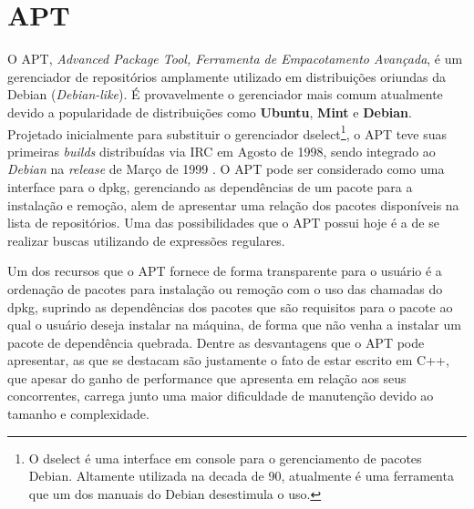\section{APT} %
\label{sec:apt}


O {\code APT}, \textit{Advanced Package Tool, Ferramenta de Empacotamento Avançada}, é um gerenciador de repositórios  amplamente utilizado em distribuições oriundas da Debian (\textit{Debian-like}).
É provavelmente o gerenciador mais comum atualmente devido a popularidade de distribuições como \textbf{Ubuntu}, \textbf{Mint} e \textbf{Debian}.
Projetado inicialmente para substituir o gerenciador {\code dselect}\footnote{O {\code dselect} é uma interface em console para o gerenciamento de pacotes Debian. Altamente utilizada na decada de 90, atualmente é uma ferramenta que um dos manuais do Debian \cite{dselect} desestimula o uso.}, o {\code APT} teve suas primeiras \textit{builds} distribuídas via IRC em Agosto de 1998,  sendo integrado ao \textit{Debian} na \textit{release} de Março de 1999 \cite{garbee2008brief}. O  {\code APT} pode ser considerado como uma interface para o {\code dpkg}, gerenciando as dependências de um pacote para a instalação e remoção, alem de apresentar uma relação dos pacotes disponíveis na lista de repositórios.  Uma das possibilidades que o {\code APT} possui hoje é a de se realizar buscas utilizando de expressões regulares.

Um dos recursos que o {\code APT} fornece de forma transparente para o usuário é a ordenação de pacotes para instalação ou remoção com o uso das chamadas do {\code dpkg}, suprindo as dependências dos pacotes que são requisitos para o pacote ao qual o usuário deseja instalar na máquina, de forma que não venha a instalar um pacote de dependência quebrada. Dentre as desvantagens que o {\code APT} pode apresentar, as que se destacam são justamente o fato de estar escrito em C++, que apesar do ganho de performance que apresenta em relação aos seus concorrentes, carrega junto uma maior dificuldade de manutenção devido ao tamanho e complexidade. 

